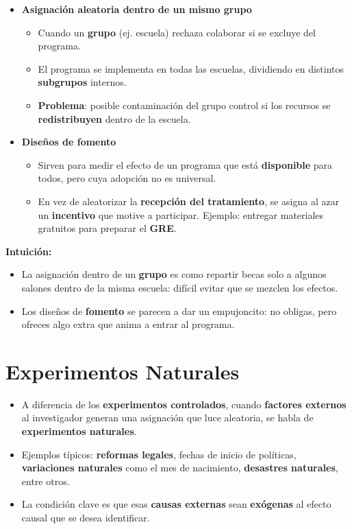 \documentclass[12pt]{article}
\begin{document}
\begin{itemize}
    \item \textbf{Asignación aleatoria dentro de un mismo grupo}
    \begin{itemize}
        \item Cuando un \textbf{grupo} (ej. escuela) rechaza colaborar si se excluye del programa.
        \item El programa se implementa en todas las escuelas, dividiendo en distintos \textbf{subgrupos} internos.
        \item \textbf{Problema}: posible contaminación del grupo control si los recursos se \textbf{redistribuyen} dentro de la escuela.
    \end{itemize}

    \item \textbf{Diseños de fomento}
    \begin{itemize}
        \item Sirven para medir el efecto de un programa que está \textbf{disponible} para todos, pero cuya adopción no es universal.
        \item En vez de aleatorizar la \textbf{recepción del tratamiento}, se asigna al azar un \textbf{incentivo} que motive a participar. Ejemplo: entregar materiales gratuitos para preparar el \textbf{GRE}.
    \end{itemize}
\end{itemize}

\textbf{Intuición:}
\begin{itemize}
    \item La asignación dentro de un \textbf{grupo} es como repartir becas solo a algunos salones dentro de la misma escuela: difícil evitar que se mezclen los efectos.
    \item Los diseños de \textbf{fomento} se parecen a dar un empujoncito: no obligas, pero ofreces algo extra que anima a entrar al programa.
\end{itemize}

\section*{\noindent\textbf{Experimentos Naturales}}

\begin{itemize}
    \item A diferencia de los \textbf{experimentos controlados}, cuando \textbf{factores externos} al investigador generan una asignación que luce aleatoria, se habla de \textbf{experimentos naturales}.
    \item Ejemplos típicos: \textbf{reformas legales}, fechas de inicio de políticas, \textbf{variaciones naturales} como el mes de nacimiento, \textbf{desastres naturales}, entre otros.
    \item La condición clave es que esas \textbf{causas externas} sean \textbf{exógenas} al efecto causal que se desea identificar.
\end{itemize}
\end{document}
